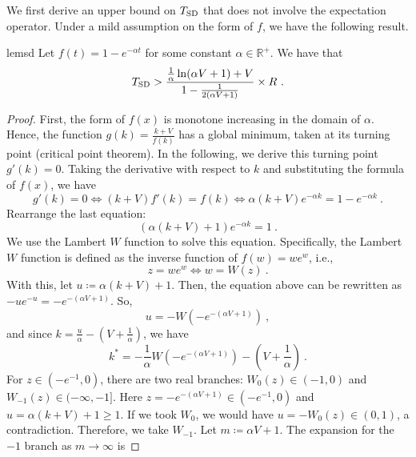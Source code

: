 

We first derive an upper bound on $T_{\textnormal{\text{SD}}}$ that does not involve the expectation operator. 
Under a mild assumption on the form of $f$, we have the following result.
\begin{restatable}{lem}{sd}
    \label{prop:sd}
    Let $f(t) = 1 - e^{-\alpha t}$ for some constant $\alpha \in \mathbb{R}^+$. We have that
    \begin{equation*}
        T_{\textnormal{\text{SD}}} > \frac{\frac{1}{\alpha}\ln(\alpha V+1) + V}{1-\frac{1}{2(\alpha V+1)}} \times R\ .
    \end{equation*}
\end{restatable}
\begin{proof}
    First, the form of $f(x)$ is monotone increasing in the domain of $\alpha$. Hence, the function $g(k) = \frac{k+V}{f(k)}$ has a global minimum, taken at its turning point (critical point theorem). In the following, we derive this turning point $g'(k) = 0$. Taking the derivative with respect to $k$ and substituting the formula of $f(x)$, we have
    \begin{equation*}
        g'(k) = 0\iff (k+V)f'(k)=f(k) \iff \alpha (k+V)e^{-\alpha k} = 1-e^{-\alpha k}\ .
    \end{equation*}
    Rearrange the last equation:
    \begin{equation*}
        (\alpha(k+V)+1)e^{-\alpha k} = 1\ .
    \end{equation*}
    We use the Lambert $W$ function to solve this equation. Specifically, the Lambert $W$ function is defined as the inverse function of $f(w) = we^{w}$, i.e.,
    \begin{equation*}
        z = we^{w} \iff w = W(z)\ .
    \end{equation*}
    With this, let $u \coloneqq \alpha(k+V) + 1$. Then, the equation above can be rewritten as $-ue^{-u}=-e^{-(\alpha V + 1)}$. So,
    \begin{equation*}
        u = -W(-e^{-(\alpha V+1)})\ ,
    \end{equation*}
    and since $k = \frac{u}{\alpha} - ( V + \frac{1}{\alpha})$, we have
    \begin{equation*}
        k^*=-\frac{1}{\alpha}W(-e^{-(\alpha V + 1)})-(V+\frac{1}{\alpha})\ .
    \end{equation*}
    For $z \in (-e^{-1},0)$, there are two real branches: $W_0(z) \in (-1,0)$ and $W_{-1}(z) \in (-\infty,-1]$. Here $z=-e^{-(\alpha V+1)} \in (-e^{-1},0)$ and $u = \alpha(k+V)+1\geq1$. If we took $W_0$, we would have $u=-W_0(z) \in (0,1)$, a contradiction. Therefore, we take $W_{-1}$. Let $m \coloneqq \alpha V+1$. The expansion for the $-1$ branch as $m \to \infty$ is

\end{proof}
